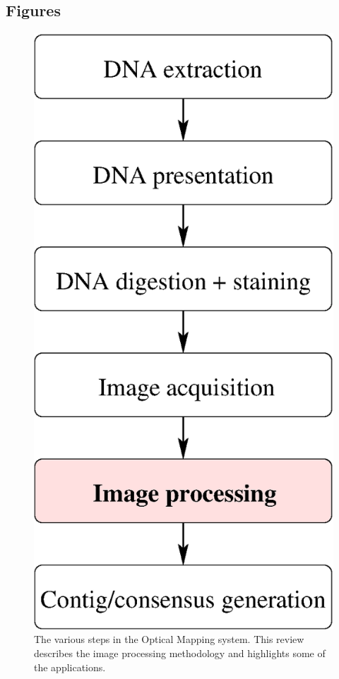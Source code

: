 \documentclass{bmcart}
\begin{document}
\begin{backmatter}


\section*{Figures}
\begin{figure}[h!]
\centering
\includegraphics[width=0.9\linewidth]{optical_mapping_pipeline}
\caption{
The various steps in the Optical Mapping system. This review describes 
the image processing methodology and highlights some of the applications.}
\label{fig:om}
\end{figure}


\end{backmatter}
\end{document}
